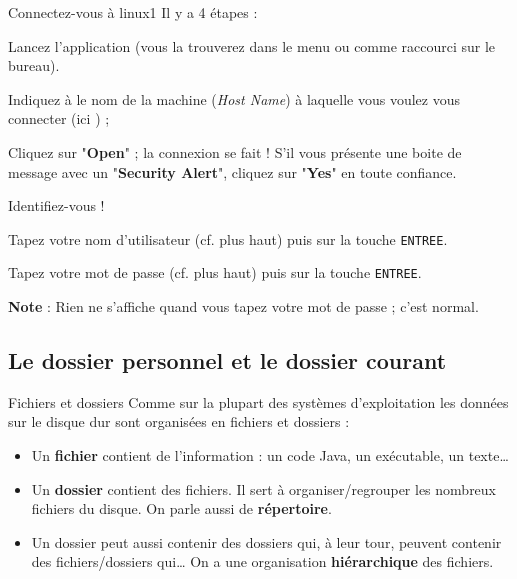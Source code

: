 \documentclass[a4paper,11pt]{style-esi/td}
\begin{document}
		\begin{Tutoriel}{Connectez-vous à linux1} 
		Il y a 4 étapes :
		\begin{steps}			
		\item 
			Lancez l'application  
			(vous la trouverez dans le menu ou comme raccourci sur le bureau).			
		\item 
			Indiquez à  le nom de la machine (\textit{Host Name}) 
			à laquelle vous voulez vous connecter (ici ) ;
		\item 
			Cliquez sur "\textbf{Open}" ; 
			la connexion se fait ! 
			S'il vous présente une boite de message avec un "\textbf{Security Alert}", 
			cliquez sur "\textbf{Yes}" en toute confiance.			
		\item 
			Identifiez-vous !
			\begin{steps}
			\item 
				Tapez votre nom d'utilisateur (cf. plus haut) 
				puis sur la touche \verb_ENTREE_. 
			\item 
				Tapez votre mot de passe (cf. plus haut) puis sur la touche \verb_ENTREE_.
				\par
				\textbf{Note} : Rien ne s'affiche quand vous tapez votre mot de passe ; c'est normal.
			\end{steps}
		\end{steps}
		\end{Tutoriel}

\newpage
	\subsection{Le dossier personnel et le dossier courant}

		\begin{theorie}{Fichiers et dossiers}
			Comme sur la plupart des systèmes d'exploitation 
			les données sur le disque dur 
			sont organisées en fichiers et dossiers :
			\begin{itemize}
			\item 
				Un \textbf{fichier} contient de l'information : 
				un code Java, un exécutable, un texte\dots{}
			\item 
				Un \textbf{dossier} contient des fichiers. 
				Il sert à organiser/regrouper les nombreux fichiers du disque. 
				On parle aussi de \textbf{répertoire}.
			\item 
				Un dossier peut aussi contenir des dossiers qui, à leur tour, 
				peuvent contenir des fichiers/dossiers qui\dots{}
				On a une organisation \textbf{hiérarchique} des fichiers.
			\end{itemize}
		\end{theorie}
\end{document}
